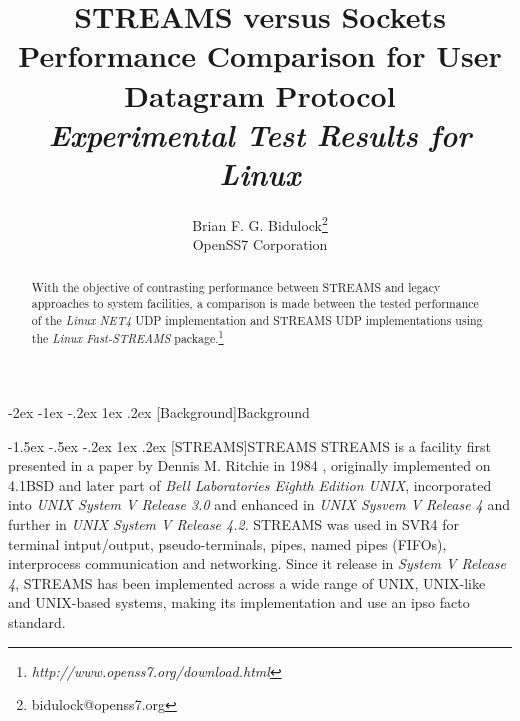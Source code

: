 \documentclass[letterpaper,final,notitlepage,twocolumn,10pt,twoside]{article}
\makeatletter
\let\large\normalsize
\let\normalsize\small
\let\small\footnotesize
\let\footnotesize\scriptsize
\let\scriptsize\tiny
\renewcommand\section{\@startsection {section}{1}{\z@}%
                                   {-2ex \@plus -1ex \@minus -.2ex}%
                                   {1ex \@plus .2ex}%
                                   {\normalfont\large\bfseries}}
\renewcommand\subsection{\@startsection{subsection}{2}{\z@}%
                                     {-1.5ex \@plus -.5ex \@minus -.2ex}%
                                     {1ex \@plus .2ex}%
                                     {\normalfont\normalsize\bfseries}}
\makeatother
\begin{document}

\title{STREAMS versus Sockets Performance Comparison for User Datagram Protocol\\[0.5ex]
	{\large \textsl{Experimental Test Results for Linux}}}
\author{Brian F. G. Bidulock\thanks{bidulock@openss7.org}\\
	OpenSS7 Corporation}
\maketitle

\begin{abstract}
With the objective of contrasting performance between STREAMS and legacy
approaches to system facilities, a comparison is made between the tested
performance of the \textsl{Linux NET4} UDP implementation and STREAMS UDP
implementations using the \textsl{Linux Fast-STREAMS}
package.\footnote{\textit{http://www.openss7.org/download.html}}
\end{abstract}


\section[Background]{Background}

\subsection[STREAMS]{STREAMS}
STREAMS is a facility first presented in a paper by Dennis M. Ritchie in 1984
\cite[]{Ritchie84}, originally implemented on 4.1BSD and later part of
\textsl{Bell Laboratories Eighth Edition UNIX}, incorporated into \textsl{UNIX
System V Release 3.0} and enhanced in \textsl{UNIX Sysvem V Release 4} and
further in \textsl{UNIX System V Release 4.2}.  STREAMS was used in SVR4 for
terminal intput/output, pseudo-terminals, pipes, named pipes (FIFOs),
interprocess communication and networking.  Since it release in \textsl{System
V Release 4}, STREAMS has been implemented across a wide range of UNIX,
UNIX-like and UNIX-based systems, making its implementation and use an ipso
facto standard.
\end{document}

